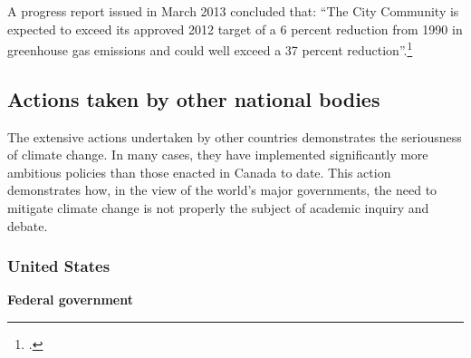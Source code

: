 A progress report issued in March 2013 concluded that: ``The City Community is expected to exceed its approved 2012 target of a 6 percent reduction from 1990 in greenhouse gas emissions and could well exceed a 37 percent reduction''.\footcite[][p. 15]{Toronto2013GHGmemo}






		\subsection{Actions taken by other national bodies}
		
		
		
The extensive actions undertaken by other countries demonstrates the seriousness of climate change.
In many cases, they have implemented significantly more ambitious policies than those enacted in Canada to date.
This action demonstrates how, in the view of the world's major governments, the need to mitigate climate change is not properly the subject of academic inquiry and debate.


		
		\subsubsection{United States}
		
		
		
\textbf{Federal government}



